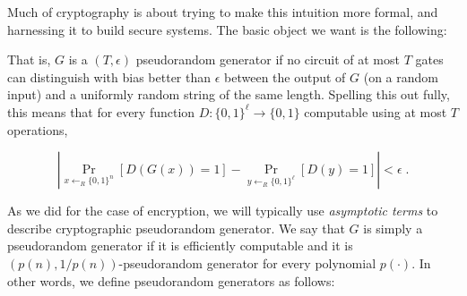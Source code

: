 Much of cryptography is about trying to make this intuition more formal,
and harnessing it to build secure systems. The basic object we want is
the following:

\hypertarget{prgdefconcrete}{}

That is, \(G\) is a \((T,\epsilon)\) pseudorandom generator if no
circuit of at most \(T\) gates can distinguish with bias better than
\(\epsilon\) between the output of \(G\) (on a random input) and a
uniformly random string of the same length. Spelling this out fully,
this means that for every function
\(D:\{0,1\}^\ell \rightarrow \{0,1\}\) computable using at most \(T\)
operations,

\begin{equation*}
\left| \Pr_{x \leftarrow_R \{0,1\}^n}[ D(G(x))=1 ] - \Pr_{y \leftarrow_R \{0,1\}^\ell}[ D(y)=1 ] \right| < \epsilon\;.
\end{equation*}

As we did for the case of encryption, we will typically use
\emph{asymptotic terms} to describe cryptographic pseudorandom
generator. We say that \(G\) is simply a pseudorandom generator if it is
efficiently computable and it is \((p(n),1/p(n))\)-pseudorandom
generator for every polynomial \(p(\cdot)\). In other words, we define
pseudorandom generators as follows:

\hypertarget{prgdef}{}

